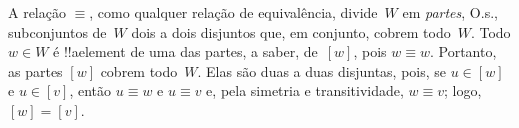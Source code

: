 \documentclass[../../../include/open-logic-section]{subfiles}
\begin{document}
A relação $\equiv$, como qualquer relação de equivalência, divide~$W$
em \emph{partes}, O.s.\@, subconjuntos de~$W$ dois a dois disjuntos
que, em conjunto, cobrem todo~$W$. Todo $w \in W$ é !!a{element} de
uma das partes, a saber, de~$[w]$, pois $w \equiv w$. Portanto, as
partes $[w]$ cobrem todo~$W$. Elas são duas a duas disjuntas, pois, se
$u \in [w]$ e $u \in [v]$, então $u \equiv w$ e $u \equiv v$ e, pela
simetria e transitividade, $w \equiv v$; logo, $[w] = [v]$.
\end{document}
